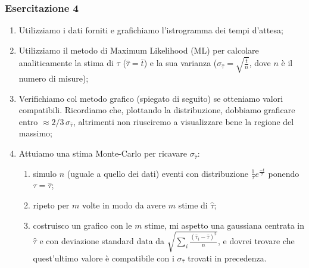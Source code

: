 \documentclass[openany,a4paper,12pt]{book}
\theoremstyle{remark}
\begin{document}
\subsubsection*{Esercitazione 4}
\begin{enumerate}
    \item Utilizziamo i dati forniti e grafichiamo l'istrogramma dei tempi d'attesa;
    \item Utilizziamo il metodo di Maximum Likelihood (ML) per calcolare analiticamente la stima di $\tau$ ($\hat{\tau}=\bar{t}$) e la sua varianza ($\sigma_{\hat{\tau}}=\sqrt{\frac{\bar{t}}{n}}$, dove $n$ è il numero di misure);
    \item Verifichiamo col metodo grafico (spiegato di seguito) se otteniamo valori compatibili. Ricordiamo che, plottando la distribuzione, dobbiamo graficare entro $\approx 2/3\,\sigma_{\hat{\tau}}$, altrimenti non riusciremo a visualizzare bene la regione del massimo;
    \item Attuiamo una stima Monte-Carlo per ricavare $\sigma_{\hat{\tau}}$:
    \begin{enumerate}
        \item simulo $n$ (uguale a quello dei dati) eventi con distribuzione $\frac{1}{\tau}e^{\frac{-t}{\tau}}$ ponendo $\tau=\hat{\tau}$;
        \item ripeto per $m$ volte in modo da avere $m$ stime di $\hat{\tau}$;
        \item costruisco un grafico con le $m$ stime, mi aspetto una gaussiana centrata in $\hat{\tau}$ e con deviazione standard data da $\sqrt{\sum_i \frac{(\hat{\tau}_i - \hat{\tau})^2}{n}}$, e dovrei trovare che quest'ultimo valore è compatibile con i $\sigma_{\hat{\tau}}$ trovati in precedenza.
    \end{enumerate}
\end{enumerate}
\end{document}
